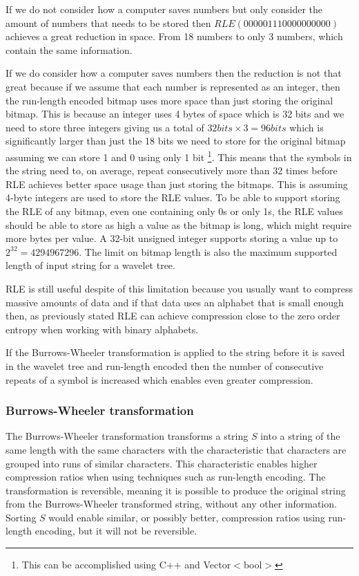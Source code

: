 If we do not consider how a computer saves numbers but only consider the amount of numbers that needs to be stored then $RLE(000001110000000000)$ achieves a great reduction in space.
From 18 numbers to only 3 numbers, which contain the same information.

If we do consider how a computer saves numbers then the reduction is not that great because if we assume that each number is represented as an integer, then the run-length encoded bitmap uses more space than just storing the original bitmap. 
This is because an integer uses 4 bytes of space which is 32 bits and we need to store three integers giving us a total of $32 bits \times 3 = 96 bits$ which is significantly larger than just the 18 bits we need to store for the original bitmap assuming we can store 1 and 0 using only 1 bit \footnote{This can be accomplished using C++ and Vector$<$bool$>$}. 
This means that the symbols in the string need to, on average, repeat consecutively more than 32 times before RLE achieves better space usage than just storing the bitmaps.
This is assuming 4-byte integers are used to store the RLE values. 
To be able to support storing the RLE of any bitmap, even one containing only 0s or only 1s, the RLE values should be able to store as high a value as the bitmap is long, which might require more bytes per value.
A 32-bit unsigned integer supports storing a value up to $2^{32} = \num{4294967296}$. 
The limit on bitmap length is also the maximum supported length of input string for a wavelet tree.

RLE is still useful despite of this limitation because you usually want to compress massive amounts of data and if that data uses an alphabet that is small enough then, as previously stated RLE can achieve compression close to the zero order entropy when working with binary alphabets.

If the Burrows-Wheeler transformation is applied to the string before it is saved in the wavelet tree and run-length encoded then the number of consecutive repeats of a symbol is increased which enables even greater compression.

\subsubsection{Burrows-Wheeler transformation}
The Burrows-Wheeler transformation transforms a string $S$ into a string of the same length with the same characters with the characteristic that characters are grouped into runs of similar characters.
This characteristic enables higher compression ratios when using techniques such as run-length encoding.
The transformation is reversible, meaning it is possible to produce the original string from the Burrows-Wheeler transformed string, without any other information.
Sorting $S$ would enable similar, or possibly better, compression ratios using run-length encoding, but it will not be reversible.

